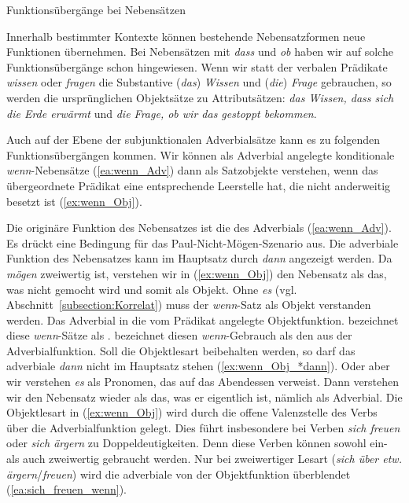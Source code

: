 \begin{Exkurs}{Funktionsübergänge bei Nebensätzen}\label{Exkurs: Übergänge Nebensatzfunktionen}
    
Innerhalb bestimmter Kontexte können bestehende Nebensatzformen neue Funktionen übernehmen. Bei Nebensätzen mit \textit{dass} und \textit{ob} haben wir auf solche Funktionsübergänge schon hingewiesen. Wenn wir statt der verbalen Prädikate \textit{wissen} oder \textit{fragen} die Substantive (\textit{das}) \textit{Wissen} und (\textit{die}) \textit{Frage} gebrauchen, so werden die ursprünglichen Objektsätze zu Attributsätzen: \textit{das Wissen, dass sich die Erde erwärmt} und \textit{die Frage, ob wir das gestoppt bekommen}. 

Auch auf der Ebene der subjunktionalen Adverbialsätze kann es zu folgenden Funktionsübergängen kommen. Wir können als Adverbial angelegte konditionale \textit{wenn}-Nebensätze (\ref{ea:wenn_Adv}) dann als Satzobjekte verstehen, wenn das übergeordnete Prädikat eine entsprechende Leerstelle hat, die nicht anderweitig besetzt ist (\ref{ex:wenn_Obj}).

\ea \label{ea:wenn_Adv_Obj}
\label{ea:wenn_Adv}
\label{ex:wenn_Obj}
\label{ex:wenn_Obj_*dann} 
\z 
\z 

Die originäre Funktion des Nebensatzes ist die des Adverbials (\ref{ea:wenn_Adv}). Es drückt eine Bedingung für das Paul-Nicht-Mögen-Szenario aus. Die adverbiale Funktion des Nebensatzes kann im Hauptsatz durch \textit{dann} angezeigt werden. Da \textit{mögen} zweiwertig ist, verstehen wir in (\ref{ex:wenn_Obj}) den Nebensatz als das, was nicht gemocht wird und somit als Objekt. Ohne \textit{es} (vgl. Abschnitt~\ref{subsection:Korrelat}) muss der \textit{wenn}-Satz als Objekt verstanden werden. Das Adverbial  in die vom Prädikat angelegte Objektfunktion. \citet[447]{Pittner2013} bezeichnet diese \textit{wenn}-Sätze als . \citet[358]{Eisenberg2020_Satz} bezeichnet diesen \textit{wenn}-Gebrauch als den  aus der Adverbialfunktion. Soll die Objektlesart beibehalten werden, so darf das adverbiale \textit{dann} nicht im Hauptsatz stehen (\ref{ex:wenn_Obj_*dann}). Oder aber wir verstehen \textit{es} als Pronomen, das \zB auf das Abendessen verweist. Dann verstehen wir den Nebensatz wieder als das, was er eigentlich ist, nämlich als Adverbial. Die Objektlesart in (\ref{ex:wenn_Obj}) wird durch die offene Valenzstelle des Verbs über die Adverbialfunktion gelegt. Dies führt insbesondere bei Verben \textit{sich freuen} oder \textit{sich ärgern} zu Doppeldeutigkeiten. Denn diese Verben können sowohl ein- als auch zweiwertig gebraucht werden. Nur bei zweiwertiger Lesart (\textit{sich über etw. ärgern}/\textit{freuen}) wird die adverbiale von der Objektfunktion überblendet (\ref{ea:sich_freuen_wenn}).


\end{Exkurs}
